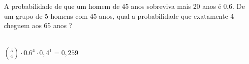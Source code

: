 \begin{ex}
 A probabilidade de que um homem de 45 anos sobreviva mais 20 anos é 0,6. De um grupo de 5 homens com 45 anos, qual a probabilidade que exatamente 4 cheguem aos 65 anos ?
 \begin{sol}
     \phantom{A} \\
 $\binom{5}{4} \cdot 0.6^4 \cdot 0,4^1 = 0,259$
    
 \end{sol}
\end{ex}